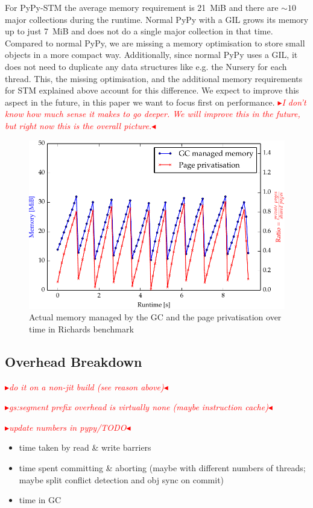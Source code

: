 \documentclass{sigplanconf}
\newcommand{\mynote}[2]{%
  \textcolor{red}{%
    \fbox{\bfseries\sffamily\scriptsize#1}%
    {\small$\blacktriangleright$\textsf{\emph{#2}}$\blacktriangleleft$}%
  }%
}
\newcommand\remi[1]{\mynote{Remi}{#1}}
\begin{document}
For PyPy-STM the average memory requirement is 21~MiB and there are
$\sim 10$ major collections during the runtime. Normal PyPy with a GIL
grows its memory up to just 7~MiB and does not do a single major
collection in that time. Compared to normal PyPy, we are missing a
memory optimisation to store small objects in a more compact
way. Additionally, since normal PyPy uses a GIL, it does not need to
duplicate any data structures like e.g. the Nursery for each
thread. This, the missing optimisation, and the additional memory
requirements for STM explained above account for this difference.
We expect to improve this aspect in the future, in this paper we
want to focus first on performance.
\remi{I don't know how much sense it makes to go deeper. We will
improve this in the future, but right now this is the overall picture.}

\begin{figure}[h]
  \centering
  \includegraphics[width=1\columnwidth]{plots/richards_mem.pdf}
  \caption{Actual memory managed by the GC and the page privatisation
    over time in Richards benchmark\label{fig:richards_mem}}
\end{figure}



\subsection{Overhead Breakdown}

\remi{do it on a non-jit build (see reason above)}
\remi{gs:segment prefix overhead is virtually none (maybe instruction cache)}
\remi{update numbers in pypy/TODO}

\begin{itemize}
\item time taken by read \& write barriers
\item time spent committing \& aborting (maybe with different numbers
  of threads; maybe split conflict detection and obj sync on commit)
\item time in GC
\end{itemize}
\end{document}
